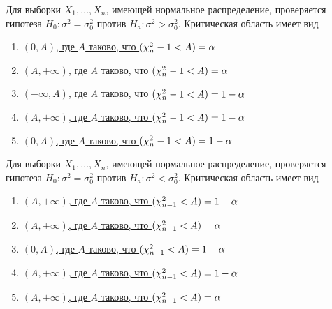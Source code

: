 \documentclass[t]{beamer}
\let\P\relax
\DeclareMathOperator{\P}{\mathbb{P}}
\begin{document}
 \begin{frame} \label{11} 
\begin{block}{11} 

  Для выборки $X_1,\ldots,X_n$, имеющей нормальное распределение, проверяется гипотеза $H_0: \sigma^2=\sigma_0^2$ против $H_a: \sigma^2 > \sigma_0^2$. Критическая область имеет вид
  


 \end{block} 
\begin{enumerate} 
\item[] \hyperlink{11-No}{\beamergotobutton{} $(0,A)$, где $A$ таково, что $\P(\chi^2_n-1 < A)  =\alpha$}
\item[] \hyperlink{11-No}{\beamergotobutton{} $(A,+\infty)$, где $A$ таково, что $\P(\chi^2_n-1 < A)  =\alpha$}
\item[] \hyperlink{11-No}{\beamergotobutton{} $(-\infty,A)$, где $A$ таково, что $\P(\chi^2_n-1 < A)  =1-\alpha$}
\item[] \hyperlink{11-Yes}{\beamergotobutton{} $(A,+\infty)$, где $A$ таково, что $\P(\chi^2_n-1 < A) =1-\alpha$}
\item[] \hyperlink{11-No}{\beamergotobutton{} $(0,A)$, где $A$ таково, что $\P(\chi^2_n-1 < A)  =1-\alpha$}
\end{enumerate} 
\end{frame} 


 \begin{frame} \label{12} 
\begin{block}{12} 

Для выборки $X_1,\ldots,X_n$, имеющей нормальное распределение, проверяется гипотеза $H_0: \sigma^2=\sigma_0^2$ против $H_a: \sigma^2 < \sigma_0^2$. Критическая область имеет вид
 \end{block} 
\begin{enumerate} 
\item[] \hyperlink{12-No}{\beamergotobutton{} $(A,+\infty)$, где $A$ таково, что $\P(\chi^2_{n-1} < A) =1-\alpha$}
\item[] \hyperlink{12-No}{\beamergotobutton{} $(A,+\infty)$, где $A$ таково, что $\P(\chi^2_{n-1} < A)  =\alpha$}
\item[] \hyperlink{12-No}{\beamergotobutton{} $(0,A)$, где $A$ таково, что $\P(\chi^2_{n-1} < A)  =1-\alpha$}
\item[] \hyperlink{12-Yes}{\beamergotobutton{} $(A,+\infty)$, где $A$ таково, что $\P(\chi^2_{n-1} < A) =1-\alpha$}
\item[] \hyperlink{12-No}{\beamergotobutton{} $(A,+\infty)$, где $A$ таково, что $\P(\chi^2_{n-1} < A)  =\alpha$}
\end{enumerate} 
\end{frame} 
\end{document}
